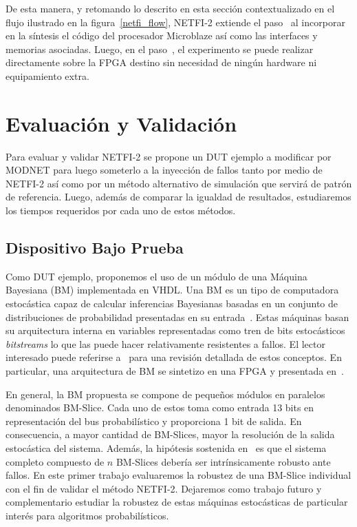 \documentclass[a4paper,openright,12pt]{report}
\newcommand*\circled[1]{\tikz[baseline=(char.base)]{
            \node[shape=circle,draw,inner sep=0.7pt] (char) {#1};}}
\begin{document}
De esta manera, y retomando lo descrito en esta sección contextualizado en el flujo ilustrado en la figura~\ref{netfi_flow}, NETFI-2 extiende el paso~\circled{3} al incorporar en la síntesis el código del procesador Microblaze así como las interfaces y memorias asociadas. Luego, en el paso~\circled{4}, el experimento se puede realizar directamente sobre la FPGA destino sin necesidad de ningún hardware ni equipamiento extra.

\section{Evaluación y Validación}
\label{EvaluacionValidacion}

Para evaluar y validar NETFI-2 se propone un DUT ejemplo a modificar por MODNET para luego someterlo a la inyección de fallos tanto por medio de NETFI-2 así como por un método alternativo de simulación que servirá de patrón de referencia. Luego, además de comparar la igualdad de resultados, estudiaremos los tiempos requeridos por cada uno de estos métodos.

\subsection{Dispositivo Bajo Prueba}

Como DUT ejemplo, proponemos el uso de un módulo de una Máquina Bayesiana (BM) implementada en VHDL. Una BM es un tipo de computadora estocástica capaz de calcular inferencias Bayesianas basadas en un conjunto de distribuciones de probabilidad presentadas en su entrada~\cite{Mazer2015}. Estas máquinas basan su arquitectura interna en variables representadas como tren de bits estocásticos \textit{bitstreams} lo que las puede hacer relativamente resistentes a fallos. El lector interesado puede referirse a~\cite{Alaghi2013} para una revisión detallada de estos conceptos. En particular, una arquitectura de BM se sintetizo  en una FPGA y presentada en~\cite{Duarte2015}. 

En general, la BM propuesta se compone de pequeños módulos en paralelos denominados BM-Slice. Cada uno de estos toma como entrada 13 bits en representación del bus probabilístico y proporciona 1 bit de salida. En consecuencia, a mayor cantidad de BM-Slices, mayor la resolución de la salida estocástica del sistema. Además, la hipótesis sostenida en~\cite{Mazer2015} es que el sistema completo compuesto de $n$ BM-Slices debería ser intrínsicamente robusto ante fallos. En este primer trabajo evaluaremos la robustez de una BM-Slice individual con el fin de validar el método NETFI-2. Dejaremos como trabajo futuro y complementario estudiar la robustez de estas máquinas estocásticas de particular interés para algoritmos probabilísticos.
\end{document}
